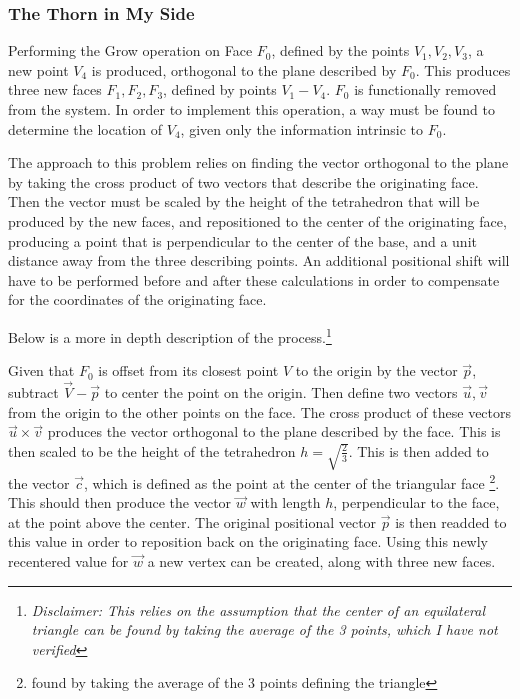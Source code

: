 \documentclass[letterpaper,oneside,titlepage]{article}
\begin{document}
\subsubsection{The Thorn in My Side}
Performing the Grow operation on Face $F_0$, defined by the points $V_1, V_2, V_3$, a new point $V_4$ is produced, orthogonal to the plane described by $F_0$.  This produces three new faces $F_1, F_2, F_3$, defined by points $V_1 - V_4$.  $F_0$ is functionally removed from the system.  In order to implement this operation, a way must be found to determine the location of $V_4$, given only the information intrinsic to $F_0$.
\par
The approach to this problem relies on finding the vector orthogonal to the plane by taking the cross product of two vectors that describe the originating face.  Then the vector must be scaled by the height of the tetrahedron that will be produced by the new faces, and repositioned to the center of the originating face, producing a point that is perpendicular to the center of the base, and a unit distance away from the three describing points.  An additional positional shift will have to be performed before and after these calculations in order to compensate for the coordinates of the originating face.
\par
Below is a more in depth description of the process.\footnote{\emph{Disclaimer: This relies on the assumption that the center of an equilateral triangle can be found by taking the average of the 3 points, which I have not verified}}
\par
Given that $F_0$ is offset from its closest point $V$ to the origin by the vector $\vec{p}$, subtract $\vec{V} - \vec{p}$ to center the point on the origin.  Then define two vectors $\vec{u}, \vec{v}$ from the origin to the other points on the face.  The cross product of these vectors $\vec{u} \times \vec{v}$ produces the vector orthogonal to the plane described by the face.  This is then scaled to be the height of the tetrahedron $h = \sqrt{\frac{2}{3}}$.  This is then added to the vector $\vec{c}$, which is defined as the point at the center of the triangular face \footnote{found by taking the average of the 3 points defining the triangle}.  This should then produce the vector $\vec{w}$ with length $h$, perpendicular to the face, at the point above the center.  The original positional vector $\vec{p}$ is then readded to this value in order to reposition back on the originating face.  Using this newly recentered value for $\vec{w}$ a new vertex can be created, along with three new faces.
\end{document}
